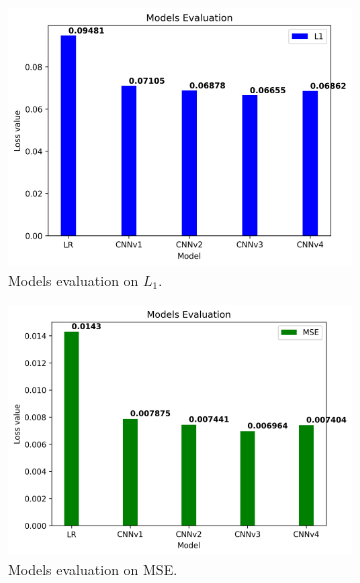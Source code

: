 \begin{figure}[H]\centering
  \begin{subfigure}[t]{0.45\textwidth}
    \centering
    \includegraphics[width=\linewidth]{img/one-trial/models_evaluation_one_trial_l1.png}
    \caption{Models evaluation on $L_1$.}
  \end{subfigure}
  \begin{subfigure}[t]{0.45\textwidth}
    \centering
    \includegraphics[width=\linewidth]{img/one-trial/models_evaluation_one_trial_mse.png}
    \caption{Models evaluation on MSE.}
  \end{subfigure}
  \\
  \begin{subfigure}[t]{0.45\textwidth}
    \centering

\end{subfigure}
\end{figure}
